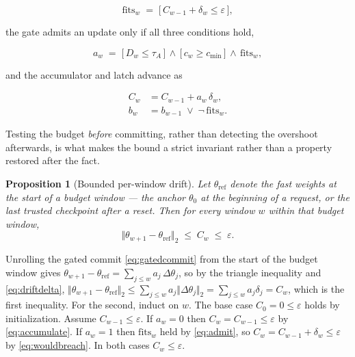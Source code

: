 \documentclass[journal]{IEEEtran}
\newcommand{\fast}{\theta}
\newcommand{\anchorp}{\theta_{0}}
\newcommand{\dtheta}{\Delta\theta}
\newcommand{\budget}{\varepsilon}
\newtheorem{proposition}{Proposition}
\begin{document}
\begin{equation}
\mathrm{fits}_w \;=\; \big[\, C_{w-1} + \delta_w \leq \budget \,\big],
\label{eq:wouldbreach}
\end{equation}

the gate admits an update only if all three conditions hold,

\begin{equation}
a_w \;=\; \big[\,D_w \leq \tau_{A}\,\big] \,\wedge\,
          \big[\,c_w \geq c_{\min}\,\big] \,\wedge\,
          \mathrm{fits}_w,
\label{eq:admit}
\end{equation}

and the accumulator and latch advance as

\begin{align}
C_w &= C_{w-1} + a_w\,\delta_w, \label{eq:accumulate}\\
b_w &= b_{w-1} \;\vee\; \neg\,\mathrm{fits}_w . \label{eq:latch}
\end{align}

Testing the budget \emph{before} committing, rather than detecting the overshoot
afterwards, is what makes the bound a strict invariant rather than a property
restored after the fact.

\begin{proposition}[Bounded per-window drift]
\label{prop:drift}
Let $\fast_{\mathrm{ref}}$ denote the fast weights at the start of a budget
window --- the anchor $\anchorp$ at the beginning of a request, or the last
trusted checkpoint after a reset. Then for every window $w$ within that budget
window,
\begin{equation}
\big\Vert \fast_{w+1} - \fast_{\mathrm{ref}} \big\Vert_{2} \;\leq\; C_w \;\leq\; \budget .
\label{eq:bound}
\end{equation}
\end{proposition}

\begin{IEEEproof}
Unrolling the gated commit \eqref{eq:gatedcommit} from the start of the budget
window gives $\fast_{w+1} - \fast_{\mathrm{ref}} = \sum_{j \leq w} a_j\,\dtheta_j$,
so by the triangle inequality and \eqref{eq:driftdelta},
$\Vert \fast_{w+1} - \fast_{\mathrm{ref}}\Vert_{2}
\leq \sum_{j\leq w} a_j \Vert \dtheta_j \Vert_{2}
= \sum_{j \leq w} a_j \delta_j = C_w$,
which is the first inequality. For the second, induct on $w$. The base case
$C_0 = 0 \leq \budget$ holds by initialization. Assume $C_{w-1} \leq \budget$. If
$a_w = 0$ then $C_w = C_{w-1} \leq \budget$ by \eqref{eq:accumulate}. If $a_w = 1$
then $\mathrm{fits}_w$ held by \eqref{eq:admit}, so
$C_w = C_{w-1} + \delta_w \leq \budget$ by \eqref{eq:wouldbreach}. In both cases
$C_w \leq \budget$.
\end{IEEEproof}
\end{document}
